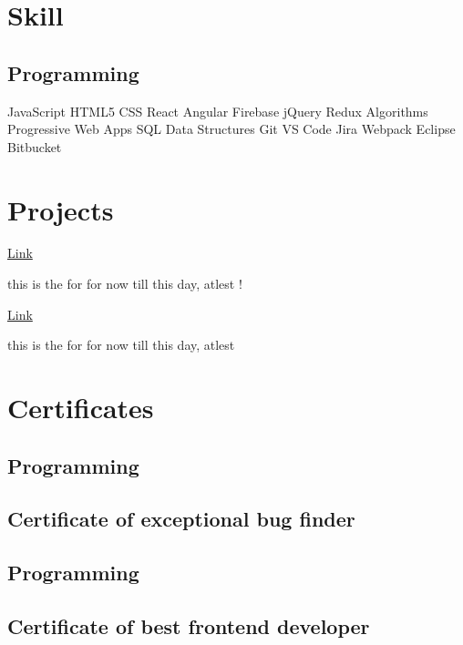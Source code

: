 \documentclass{resumecustom}%
\begin{document}
\section{Skill}%
\label{sec:Skill}%
\subsection{Programming}%
\textbf{}%
JavaScript \textbullet{} HTML5 \textbullet{} CSS \textbullet{} React \textbullet{} Angular%
\newline%
\textbf{
}%
 \textbullet{} Firebase%
 \textbullet{} jQuery%
 \textbullet{} Redux%
 \textbullet{} Algorithms%
 \textbullet{} Progressive Web Apps%
 \textbullet{} SQL%
 \textbullet{} Data Structures%
\newline%
\textbf{
}%
 \textbullet{} Git%
 \textbullet{} VS Code%
 \textbullet{} Jira%
 \textbullet{} Webpack%
 \textbullet{} Eclipse%
 \textbullet{} Bitbucket

%
\sectionsep%
\section{Projects}%
%
\textbar{} \href{youtube.com}{Link}%
\vspace{\topsep}%
\begin{tightemize}%
\item this is the for for now till this day, atlest !%
\end{tightemize}%
\sectionsep%
%
\textbar{} \href{gogole.com}{Link}%
\vspace{\topsep}%
\begin{tightemize}%
\item this is the for for now till this day, atlest%
\end{tightemize}%
\sectionsep%
\section{Certificates}%
\label{sec:Certificates}%

%
\subsection{Programming}%
\subsection{Certificate of exceptional bug finder}
%
%
\sectionsep%
\subsection{Programming}%
\subsection{Certificate of best frontend developer}
%
%
\sectionsep%
\sectionsep%
\end{document}
